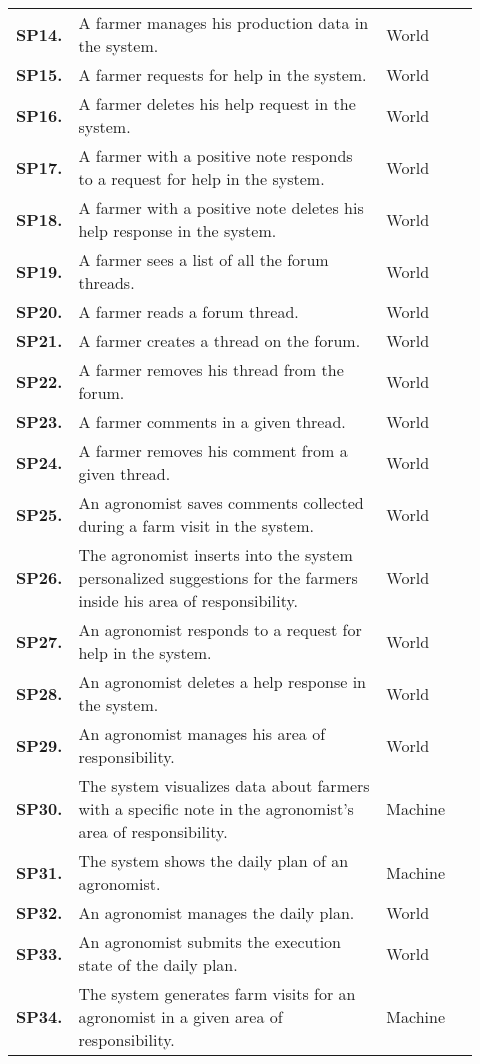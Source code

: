 \begin{longtable}{@{}p{0.06\linewidth} p{0.66\linewidth} p{0.20\linewidth}@{}}
    \textbf{SP14.} & A farmer manages his production data in the system. & World \\
    \textbf{SP15.} & A farmer requests for help in the system. & World \\
    \textbf{SP16.} & A farmer deletes his help request in the system. & World \\
    \textbf{SP17.} & A farmer with a positive note responds to a request for help in the system. & World \\
    \textbf{SP18.} & A farmer with a positive note deletes his help response in the system. & World \\
    \textbf{SP19.} & A farmer sees a list of all the forum threads. & World\\
    \textbf{SP20.} & A farmer reads a forum thread. & World\\
    \textbf{SP21.} & A farmer creates a thread on the forum.  & World \\
    \textbf{SP22.} & A farmer removes his thread from the forum.  & World \\
    \textbf{SP23.} & A farmer comments in a given thread. & World \\
    \textbf{SP24.} & A farmer removes his comment from a given thread. & World \\
    
    \textbf{SP25.} & An agronomist saves comments collected during a farm visit in the system. & World \\
    \textbf{SP26.} & The agronomist inserts into the system personalized suggestions for the farmers inside his area of responsibility. & World \\
    \textbf{SP27.} & An agronomist responds to a request for help in the system. & World \\
    \textbf{SP28.} & An agronomist deletes a help response in the system. & World \\
    \textbf{SP29.} & An agronomist manages his area of responsibility. & World \\
    \textbf{SP30.} & The system visualizes data about farmers with a specific note in the agronomist's area of responsibility. & Machine \\
    \textbf{SP31.} & The system shows the daily plan of an agronomist. & Machine \\
    \textbf{SP32.} & An agronomist manages the daily plan. & World \\
    \textbf{SP33.} & An agronomist submits the execution state of the daily plan. & World \\
    \textbf{SP34.} & The system generates farm visits for an agronomist in a given area of responsibility. & Machine \\
    

\end{longtable}
